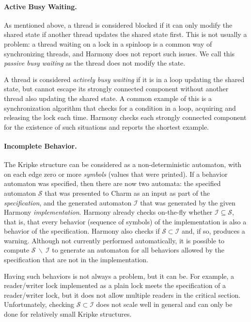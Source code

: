 \documentclass[twocolumn]{article}
\begin{document}
\paragraph{Active Busy Waiting.}

As mentioned above, a thread is considered blocked if it can only
modify the shared state if another thread updates the shared state
first.  This is not usually a problem: a thread waiting on a lock
in a spinloop is a common way of synchronizing threads, and Harmony
does not report such issues.  We call this \emph{passive busy
waiting} as the thread does not modify the state.

A thread is considered \emph{actively busy waiting} if it is in a
loop updating the shared state, but cannot
escape its strongly connected component without another thread
also updating the shared state.  A common example of this is a
synchronization algorithm that checks for a condition in a loop,
acquiring and releasing the lock each time.  Harmony checks each
strongly connected component for the existence of such situations
and reports the shortest example.

\paragraph{Incomplete Behavior.}

The Kripke structure can be considered as a non-deterministic
automaton, with on each edge zero or more \emph{symbols} (values
that were printed).  If a behavior automaton was specified,
then there are now two automata: the specified automaton
${\mathcal S}$ that was presented to Charm as an input as
part of the \emph{specification}, and the generated automaton
${\mathcal I}$ that was generated by the given Harmony
\emph{implementation}.  Harmony already checks on-the-fly whether
${\mathcal I} \subseteq {\mathcal S}$, that is, that every
behavior (sequence of symbols) of the implementation is also a
behavior of the specification.  Harmony also checks if
${\mathcal S} \subset {\mathcal I}$ and, if so,
produces a warning.
Although not currently performed automatically, it is possible to compute
${\mathcal S}~\backslash~{\mathcal I}$
to generate an automaton for all behaviors allowed by the
specification that are not in the implementation.

Having such behaviors is not always a problem, but it can be.  For
example, a reader/writer lock implemented as a plain lock meets the
specification of a reader/writer lock, but it does not allow multiple
readers in the critical section.  Unfortunately, checking ${\mathcal
S} \subset {\mathcal I}$ does not scale well in general and can
only be done for relatively small Kripke structures.
\end{document}
